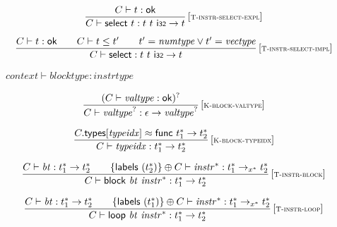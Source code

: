 $$
\begin{array}{@{}c@{}}\displaystyle
\frac{
C \vdash t : \mathsf{ok}
}{
C \vdash \mathsf{select}~t : t~t~\mathsf{i{\scriptstyle 32}} \rightarrow t
} \, {[\textsc{\scriptsize T{-}instr{-}select{-}expl}]}
\qquad
\end{array}
$$

$$
\begin{array}{@{}c@{}}\displaystyle
\frac{
C \vdash t : \mathsf{ok}
 \qquad
C \vdash t \leq {t'}
 \qquad
{t'} = {\mathit{numtype}} \lor {t'} = {\mathit{vectype}}
}{
C \vdash \mathsf{select} : t~t~\mathsf{i{\scriptstyle 32}} \rightarrow t
} \, {[\textsc{\scriptsize T{-}instr{-}select{-}impl}]}
\qquad
\end{array}
$$

\vspace{1ex}

$\boxed{{\mathit{context}} \vdash {\mathit{blocktype}} : {\mathit{instrtype}}}$

$$
\begin{array}{@{}c@{}}\displaystyle
\frac{
(C \vdash {\mathit{valtype}} : \mathsf{ok})^?
}{
C \vdash {{\mathit{valtype}}^?} : \epsilon \rightarrow {{\mathit{valtype}}^?}
} \, {[\textsc{\scriptsize K{-}block{-}valtype}]}
\qquad
\end{array}
$$

$$
\begin{array}{@{}c@{}}\displaystyle
\frac{
C{.}\mathsf{types}{}[{\mathit{typeidx}}] \approx \mathsf{func}~{t_1^\ast} \rightarrow {t_2^\ast}
}{
C \vdash {\mathit{typeidx}} : {t_1^\ast} \rightarrow {t_2^\ast}
} \, {[\textsc{\scriptsize K{-}block{-}typeidx}]}
\qquad
\end{array}
$$

\vspace{1ex}

$$
\begin{array}{@{}c@{}}\displaystyle
\frac{
C \vdash {\mathit{bt}} : {t_1^\ast} \rightarrow {t_2^\ast}
 \qquad
\{ \mathsf{labels}~({t_2^\ast}) \} \oplus C \vdash {{\mathit{instr}}^\ast} : {t_1^\ast} \rightarrow_{{x^\ast}} {t_2^\ast}
}{
C \vdash \mathsf{block}~{\mathit{bt}}~{{\mathit{instr}}^\ast} : {t_1^\ast} \rightarrow {t_2^\ast}
} \, {[\textsc{\scriptsize T{-}instr{-}block}]}
\qquad
\end{array}
$$

$$
\begin{array}{@{}c@{}}\displaystyle
\frac{
C \vdash {\mathit{bt}} : {t_1^\ast} \rightarrow {t_2^\ast}
 \qquad
\{ \mathsf{labels}~({t_1^\ast}) \} \oplus C \vdash {{\mathit{instr}}^\ast} : {t_1^\ast} \rightarrow_{{x^\ast}} {t_2^\ast}
}{
C \vdash \mathsf{loop}~{\mathit{bt}}~{{\mathit{instr}}^\ast} : {t_1^\ast} \rightarrow {t_2^\ast}
} \, {[\textsc{\scriptsize T{-}instr{-}loop}]}
\qquad
\end{array}
$$

